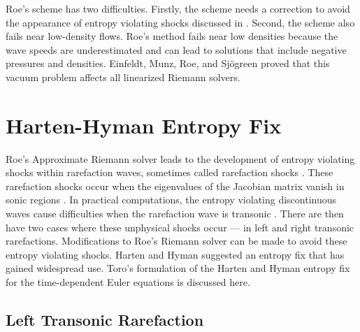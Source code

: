 Roe's scheme has two difficulties. Firstly, the scheme needs a correction to avoid the appearance of entropy violating shocks discussed in . Second, the scheme also fails near low-density flows. Roe's method fails near low densities because the wave speeds are underestimated and can lead to solutions that include negative pressures and densities. Einfeldt, Munz, Roe, and Sjögreen \cite{EINFELDT1991273} proved that this vacuum problem affects all linearized Riemann solvers.
\section{Harten-Hyman Entropy Fix}\label{sect:EntropyFix}
Roe's Approximate Riemann solver leads to the development of entropy violating shocks within rarefaction waves, sometimes called rarefaction shocks \cite{toro2013riemann}. These rarefaction shocks occur when the eigenvalues of the Jacobian matrix vanish in sonic regions \cite{Kermani}. In practical computations, the entropy violating discontinuous waves cause difficulties when the rarefaction wave is transonic \cite{toro2013riemann}. There are then have two cases where these unphysical shocks occur --- in left and right transonic rarefactions. Modifications to Roe's Riemann solver can be made to avoid these entropy violating shocks. Harten and Hyman \cite{HARTEN1983235} suggested an entropy fix that has gained widespread use. Toro's \cite{toro2013riemann} formulation of the Harten and Hyman entropy fix for the time-dependent Euler equations is discussed here.

\subsection{Left Transonic Rarefaction}


